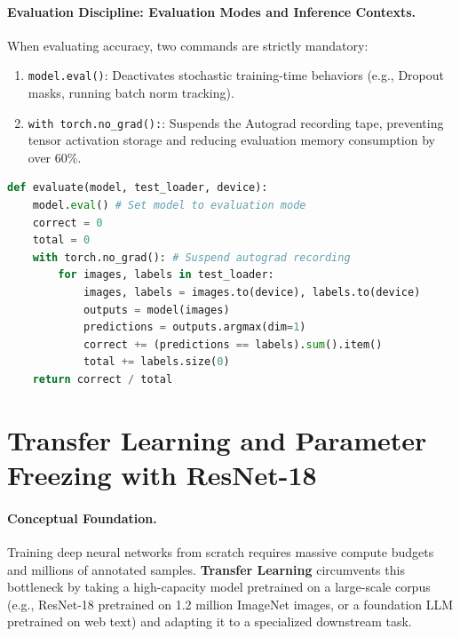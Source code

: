 \documentclass[11pt,a4paper]{article}
\begin{document}
\paragraph{Evaluation Discipline: Evaluation Modes and Inference Contexts.}
When evaluating accuracy, two commands are strictly mandatory:
\begin{enumerate}
    \item \texttt{model.eval()}: Deactivates stochastic training-time behaviors (e.g., Dropout masks, running batch norm tracking).
    \item \texttt{with torch.no\_grad():}: Suspends the Autograd recording tape, preventing tensor activation storage and reducing evaluation memory consumption by over $60\%$.
\end{enumerate}

\begin{lstlisting}[language=Python, caption={Validation routine with gradient deactivation (Cell 48).}, label={lst:lab01_val_routine}]
def evaluate(model, test_loader, device):
    model.eval() # Set model to evaluation mode
    correct = 0
    total = 0
    with torch.no_grad(): # Suspend autograd recording
        for images, labels in test_loader:
            images, labels = images.to(device), labels.to(device)
            outputs = model(images)
            predictions = outputs.argmax(dim=1)
            correct += (predictions == labels).sum().item()
            total += labels.size(0)
    return correct / total
\end{lstlisting}

\clearpage

\section[Transfer Learning with ResNet-18]{Transfer Learning and Parameter Freezing with ResNet-18}

\paragraph{Conceptual Foundation.}
Training deep neural networks from scratch requires massive compute budgets and millions of annotated samples. \textbf{Transfer Learning} circumvents this bottleneck by taking a high-capacity model pretrained on a large-scale corpus (e.g., ResNet-18 pretrained on 1.2 million ImageNet images, or a foundation LLM pretrained on web text) and adapting it to a specialized downstream task. 
\end{document}
